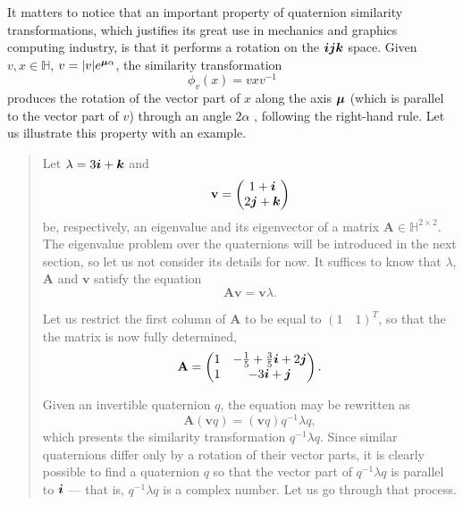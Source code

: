 It matters to notice that an important property of quaternion similarity transformations, which justifies its great use in mechanics and graphics computing industry, is that it performs a rotation on the $\boldsymbol{i} \boldsymbol{j} \boldsymbol{k}$ space. Given $ v,x \in \mathbb{H} $, $ v = |v| e^{\boldsymbol{\mu} \alpha}$, the similarity transformation
\begin{equation}
\label{eq:rotacao}
\phi_v(x) = v x v^{-1}
\end{equation}
produces the rotation of the vector part of $x$ along the axis $ \boldsymbol{\mu} $ (which is parallel to the vector part of $v$) through an angle $ 2\alpha $ \cite{ward2012quaternions}, following the right-hand rule. Let us illustrate this property with an example.

\vspace{-2em}
\begin{quotation}
\begin{example}
\label{example:01}
\upshape
Let $ \lambda = 3\boldsymbol{i} + \boldsymbol{k} $ and
\begin{equation}
\mathbf{v} =\begin{pmatrix}
1 +  \boldsymbol{i}\\
2 \boldsymbol{j} + \boldsymbol{k}
\end{pmatrix}
\end{equation}
be, respectively, an eigenvalue and its eigenvector of a matrix $\mathbf{A} \in \mathbb{H}^{2 \times 2}$. The eigenvalue problem over the quaternions will be introduced in the next section, so let us not consider its details for now. It suffices to know that $\lambda$, $\mathbf{A}$ and $\mathbf{v}$ satisfy the equation
\begin{equation}
\label{eq:03}
\mathbf{A} \mathbf{v} = \mathbf{v} \lambda.
\end{equation}

Let us restrict the first column of $\mathbf{A}$ to be equal to $ (1 \quad 1)^T $, so that the the matrix is now fully determined,
\begin{equation}
\mathbf{A} =
\begin{pmatrix}
1 & - \frac{1}{5} + \frac{3}{5} \boldsymbol{i} + 2 \boldsymbol{j} \\
1 & -3 \boldsymbol{i} + \boldsymbol{j}
\end{pmatrix}.
\end{equation}

Given an invertible quaternion $q$, the equation may be rewritten as
\begin{equation}
\label{eq:rewritten}
\mathbf{A} (\mathbf{v} q) = (\mathbf{v} q) q^{-1} \lambda q,
\end{equation}
which presents the similarity transformation $q^{-1} \lambda q$. Since similar quaternions differ only by a rotation of their vector parts, it is clearly possible to find a quaternion $q$ so that the vector part of $q^{-1} \lambda q$ is parallel to $\boldsymbol{i}$ --- that is, $q^{-1} \lambda q$ is a complex number. Let us go through that process.


\end{example}
\end{quotation}
